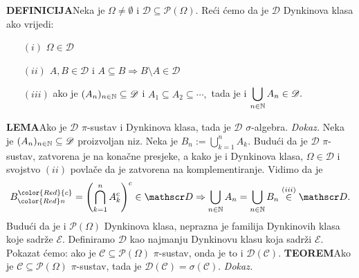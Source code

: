 \documentclass{article}
\begin{document}
\textbf{DEFINICIJA}\newline Neka je \(\Omega\ne\emptyset\) i \(\mathscr D\subseteq\mathcal P(\Omega).\) Reći ćemo da je \(\mathscr D\) Dynkinova klasa ako vrijedi:
\begin{enumerate}
    \item[\((i)\)] \(\Omega\in\mathscr D\)
    \item[\((ii)\)] \(A,B\in\mathscr D\) i \(A\subseteq B\Rightarrow B\setminus A\in\mathscr D\)
    \item[\((iii)\)] ako je \((A_n)_{n\in\Bbb N}\subseteq\mathscr D\) i \(A_1\subseteq A_2\subseteq\cdots,\) tada je i \(\displaystyle\bigcup_{n\in\Bbb N}A_n\in\mathscr D.\) 
\end{enumerate}
\textbf{LEMA}\newline Ako je \(\mathscr D\) \(\pi\)-sustav i Dynkinova klasa, tada je \(\mathscr D\) \(\sigma\)-algebra.\newline\newline
\textit{Dokaz.}\newline
Neka je \((A_n)_{n\in\Bbb N}\subseteq\mathscr D\) proizvoljan niz. Neka je \(B_n:=\bigcup_{k=1}^nA_k.\) Budući da je \(\mathscr D\) \(\pi\)-sustav, zatvorena je na konačne presjeke, a kako je i Dynkinova klasa, \(\Omega\in\mathscr D\) i svojstvo \((ii)\) povlače da je zatvorena na komplementiranje. Vidimo da je \[B_{\color{Red}n}^{\color{Red}{c}}=\left(\bigcap_{k=1}^nA_k^c\right)^c\in\mathscr D\Rightarrow\bigcup_{n\in\Bbb N}A_n=\bigcup_{n\in\Bbb N}B_n\overset{(iii)}{\in}\mathscr D.\] Budući da je i \(\mathcal P(\Omega)\) Dynkinova klasa, neprazna je familija Dynkinovih klasa koje sadrže \(\mathcal E.\) Definiramo \(\mathscr D\) kao najmanju Dynkinovu klasu koja sadrži \(\mathcal E.\)\newline\newline Pokazat ćemo: ako je \(\mathcal C\subseteq\mathcal P(\Omega)\) \(\pi\)-sustav, onda je to i \(\mathscr D(\mathcal C).\)\newline\newline  
\textbf{TEOREM}\newline Ako je \(\mathcal C\subseteq\mathcal P(\Omega)\) \(\pi\)-sustav, tada je \(\mathscr D(\mathcal C)=\sigma(\mathcal C).\)\newline\newline
\textit{Dokaz.}\newline
\end{document}

